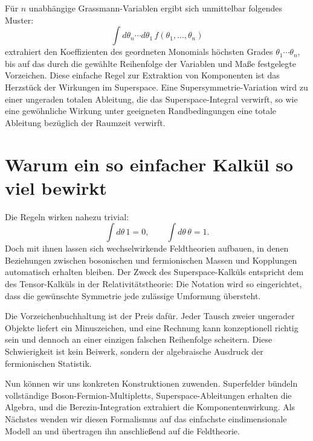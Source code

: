 Für \(n\) unabhängige Grassmann-Variablen ergibt sich unmittelbar folgendes Muster:
\begin{equation}
\int d\theta_n\cdots d\theta_1\,
f(\theta_1,\ldots,\theta_n)
\end{equation}
extrahiert den Koeffizienten des geordneten Monomials höchsten Grades
\(\theta_1\cdots\theta_n\), bis auf das durch die gewählte Reihenfolge der Variablen und Maße festgelegte Vorzeichen. Diese einfache Regel zur Extraktion von Komponenten ist das Herzstück der Wirkungen im Superspace. Eine Supersymmetrie-Variation wird zu einer ungeraden totalen Ableitung, die das Superspace-Integral verwirft, so wie eine gewöhnliche Wirkung unter geeigneten Randbedingungen eine totale Ableitung bezüglich der Raumzeit verwirft.

\section{Warum ein so einfacher Kalkül so viel bewirkt}

Die Regeln wirken nahezu trivial:
\begin{equation}
\int d\theta\,1=0,
\qquad
\int d\theta\,\theta=1.
\end{equation}
Doch mit ihnen lassen sich wechselwirkende Feldtheorien aufbauen, in denen Beziehungen zwischen bosonischen und fermionischen Massen und Kopplungen automatisch erhalten bleiben. Der Zweck des Superspace-Kalküls entspricht dem des Tensor-Kalküls in der Relativitätstheorie: Die Notation wird so eingerichtet, dass die gewünschte Symmetrie jede zulässige Umformung übersteht.

Die Vorzeichenbuchhaltung ist der Preis dafür. Jeder Tausch zweier ungerader Objekte liefert ein Minuszeichen, und eine Rechnung kann konzeptionell richtig sein und dennoch an einer einzigen falschen Reihenfolge scheitern. Diese Schwierigkeit ist kein Beiwerk, sondern der algebraische Ausdruck der fermionischen Statistik.

\begin{classroomqa}
\end{classroomqa}

Nun können wir uns konkreten Konstruktionen zuwenden. Superfelder bündeln vollständige Boson-Fermion-Multipletts, Superspace-Ableitungen erhalten die Algebra, und die Berezin-Integration extrahiert die Komponentenwirkung. Als Nächstes wenden wir diesen Formalismus auf das einfachste eindimensionale Modell an und übertragen ihn anschließend auf die Feldtheorie.
